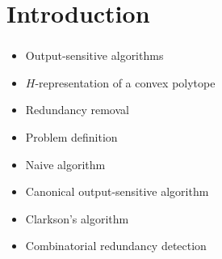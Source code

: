 \section{Introduction}
\begin{frame}\frametitle{\insertsection}\justifying
{}
\begin{itemize}[label={\color{prussianblue}$\bullet$},itemsep=6pt]
\item Output-sensitive algorithms\pause
\item \(H\)-representation of a convex polytope\pause
\item Redundancy removal\pause
\end{itemize}
\vspace{.5cm}
\begin{itemize}[label={\color{prussianblue}$\bullet$},itemsep=6pt]
\item Problem definition\pause
\item Naive algorithm\pause
\item Canonical output-sensitive algorithm \cite{clarkson:1994}\pause
\item Clarkson's algorithm \cite{clarkson:1994}\pause
\item Combinatorial redundancy detection \cite{fukuda:2014}
\end{itemize}
\end{frame}
